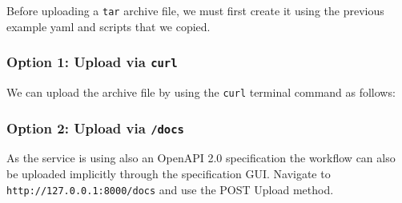 Before uploading a \texttt{tar} archive file, we must first create it
using the previous example yaml and scripts that we copied.

\begin{Shaded}
\begin{Highlighting}[]
 
\end{Highlighting}
\end{Shaded}

\subsubsection{\texorpdfstring{Option 1: Upload via
\texttt{curl}}{Option 1: Upload via curl}}\label{option-1-upload-via-curl}

We can upload the archive file by using the \texttt{curl} terminal
command as follows:

\begin{Shaded}
\begin{Highlighting}[]
   \DataTypeTok{\textbackslash{}}
   \DataTypeTok{\textbackslash{}}
    \DataTypeTok{\textbackslash{}}
   \StringTok{\textquotesingle{}\textquotesingle{}}
\end{Highlighting}
\end{Shaded}

\subsubsection{\texorpdfstring{Option 2: Upload via
\texttt{/docs}}{Option 2: Upload via /docs}}\label{option-2-upload-via-docs}

As the service is using also an OpenAPI 2.0 specification the workflow
can also be uploaded implicitly through the specification GUI. Navigate
to \texttt{http://127.0.0.1:8000/docs} and use the POST Upload method.

